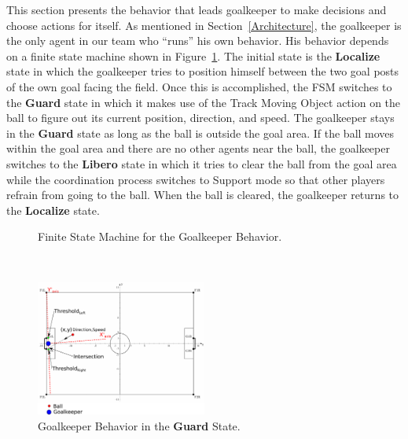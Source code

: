This section presents the behavior that leads goalkeeper to make decisions and choose actions for itself. As mentioned in Section~\ref{Architecture}, the goalkeeper is the only agent in our team who ``runs'' his own behavior. His behavior depends on a finite state machine shown in Figure~\ref{fig:GoalkeeperFSM}. The initial state is the \textbf{Localize} state in which the goalkeeper tries to position himself between the two goal posts of the own goal facing the field. Once this is accomplished, the FSM switches to the \textbf{Guard} state in which it makes use of the Track Moving Object action on the ball to figure out its current position, direction, and speed. The goalkeeper stays in the \textbf{Guard} state as long as the ball is outside the goal area. If the ball moves within the goal area and there are no other agents near the ball, the goalkeeper switches to the \textbf{Libero} state in which it tries to clear the ball from the goal area while the coordination process switches to Support mode so that other players refrain from going to the ball. When the ball is cleared, the goalkeeper returns to the \textbf{Localize} state.
 
\begin{figure}[t!]
\begin{center}
\end{center}
\vspace*{-0.7cm}
  \caption{Finite State Machine for the Goalkeeper Behavior.}
  \label{fig:GoalkeeperFSM}
\end{figure} 
~
\begin{figure}[t!]
\centering
  \includegraphics[trim = 0cm 0cm 10cm 0cm, clip,width=0.5\textwidth]{Chapter3/figures/Goalie.pdf}  
  \caption{Goalkeeper Behavior in the \textbf{Guard} State.}
  \label{fig:Goalkeeper}
\end{figure} 

